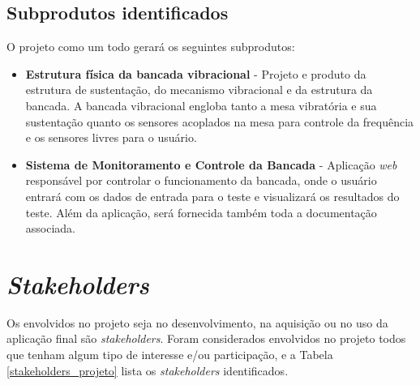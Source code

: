 \begin{apendicesenv}
    \subsection*{Subprodutos identificados}
    
    	O projeto como um todo gerará os seguintes subprodutos:
        
        \begin{itemize}
        	\item \textbf{Estrutura física da bancada vibracional} - Projeto e produto
            			  da estrutura de sustentação, do mecanismo vibracional e da
                          estrutura da bancada. A bancada vibracional engloba tanto a
                          mesa vibratória e sua sustentação quanto os 
                          sensores acoplados na mesa para controle da frequência e os
                          sensores livres para o usuário.
        	\item \textbf{Sistema de Monitoramento e Controle da Bancada} - 
                          Aplicação \textit{web} responsável por controlar o
                          funcionamento da bancada, onde o usuário entrará com
                          os dados de entrada para o teste e visualizará os
                          resultados do teste. Além da aplicação, será fornecida
                          também toda a documentação associada.
        \end{itemize}

\section*{\textit{Stakeholders}}

Os envolvidos no projeto seja no desenvolvimento, na aquisição ou no uso da aplicação final são \textit{stakeholders}. Foram considerados envolvidos no projeto todos que tenham algum tipo de interesse e/ou participação, e a Tabela \ref{stakeholders_projeto} lista os \textit{stakeholders} identificados.
        

\end{apendicesenv}
